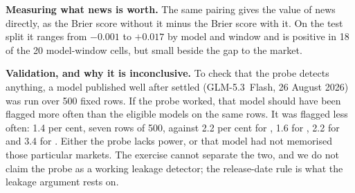 \textbf{Measuring what news is worth.} The same pairing gives the value of news
directly, as the Brier score without it minus the Brier score with it. On the test split it ranges from $-0.001$ to $+0.017$ by model and window and is
positive in 18 of the 20 model-window cells, but small beside the gap to the
market.

\textbf{Validation, and why it is inconclusive.} To check that the probe detects
anything, a model published well after \winA settled (\mbox{GLM-5.3 Flash}, 26
August 2026) was run over 500 fixed \winA
rows. If the probe worked, that model should have been flagged more often than
the eligible models on the same rows. It was flagged less often: 1.4 per cent,
seven rows of 500, against 2.2 per cent for \mGptFiveTwo, 1.6 for
\mDeepSeekVThreeTwo, 2.2 for \mKimiKTwoFive and 3.4 for \mGptOss. Either the
probe lacks power, or that model had not memorised those particular markets. The
exercise cannot separate the two, and we do not claim the probe as a working
leakage detector; the release-date rule is what the leakage argument rests on.
